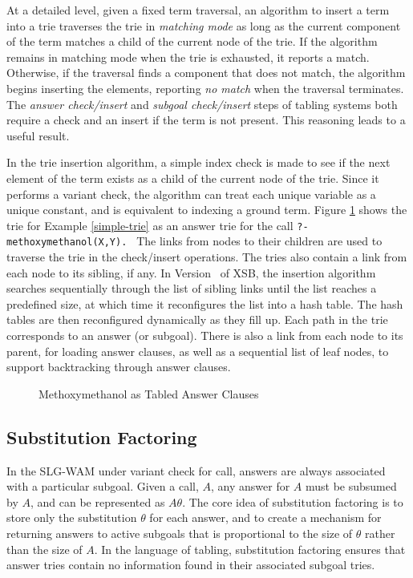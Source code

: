 At a detailed level, given a fixed term traversal, an algorithm to
insert a term into a trie traverses the trie in {\em matching mode} as
long as the current component of the term matches a child of the
current node of the trie.  If the algorithm remains in matching mode
when the trie is exhausted, it reports a match.  Otherwise, if the
traversal finds a component that does not match, the algorithm begins
inserting the elements, reporting {\em no match} when the traversal
terminates.  The {\em answer check/insert} and {\em subgoal
check/insert} steps of tabling systems both require a check and an
insert if the term is not present.  This reasoning leads to a useful
result.

In the trie insertion algorithm, a simple index check is made to see
if the next element of the term exists as a child of the current node
of the trie.  Since it performs a variant check, the algorithm can
treat each unique variable as a unique constant, and is equivalent to
indexing a ground term.  Figure \ref{concrete-trie.eps} shows the trie
for Example \ref{simple-trie} as an answer trie for the call {\tt ?-
methoxymethanol(X,Y). } The links from nodes to their children are
used to traverse the trie in the check/insert operations.  The tries
also contain a link from each node to its sibling, if any.  In Version
\version\ of XSB, the insertion algorithm searches sequentially through the
list of sibling links until the list reaches a predefined size, at
which time it reconfigures the list into a hash table.  The hash
tables are then reconfigured dynamically as they fill up.  Each path in
the trie corresponds to an answer (or subgoal).  There is also a link
from each node to its parent, for loading answer clauses, as well as a
sequential list of leaf nodes, to support backtracking through answer
clauses.  

\begin{figure}[htbp]
\mbox{}
\caption{Methoxymethanol as Tabled Answer Clauses}\label{concrete-trie.eps}
\end{figure}

\subsection{Substitution Factoring} \label{impl-sub-fac}

In the SLG-WAM under variant check for call, answers are always
associated with a particular subgoal.  Given a call, $A$, any answer
for $A$ must be subsumed by $A$, and can be represented as $A\theta$.
The core idea of substitution factoring is to store only the
substitution $\theta$ for each answer, and to create a mechanism for
returning answers to active subgoals that is proportional to the size
of $\theta$ rather than the size of $A$.  In the language of tabling,
substitution factoring ensures that answer tries contain no
information found in their associated subgoal tries.

